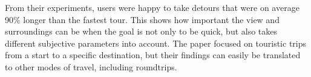 From their experiments, users were happy to take detours that were on average 90\% longer than the fastest tour.
This shows how important the view and surroundings can be when the goal is not only to be quick, but also takes different subjective parameters into account.
The paper focused on touristic trips from a start to a specific destination, but their findings can easily be translated to other modes of travel, including roundtrips. \cite{alivand_analyzing_2015}



